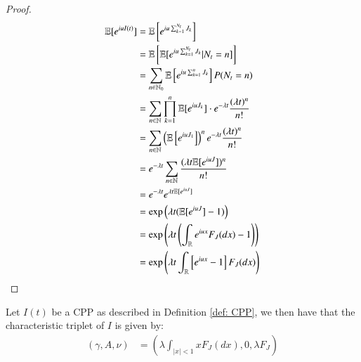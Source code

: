 \begin{proof}

\begin{align*}
\mathbb{E}[e^{iuI(t)}] &= 
\mathbb{E}\left[
e^{iu \sum_{k=1}^{N_{t}}J_{k}}
\right] \\
&= 
\mathbb{E}\left[\mathbb{E}[e^{iu \sum_{k=1}^{N_{t}}J_{k}}|N_{t}=n]\right] \\ 
&= 
\sum_{n\in \mathbb{N}_{0}}\mathbb{E}\left[e^{iu\sum_{k=1}^{n}J_{k}}\right]P(N_{t}=n) \\
&= 
\sum_{n\in \mathbb{N}}\prod_{k=1}^{n}\mathbb{E}[e^{iuJ_{k}}]\cdot e^{-\lambda t}\frac{(\lambda t)^{n}}{n!} \\ 
&= 
\sum_{n\in \mathbb{N}}\left(
\mathbb{E}\left[e^{iuJ_{1}}\right]
\right)^{n}e^{-\lambda t}\frac{(\lambda t)^{n}}{n!} \\ 
&= 
e^{-\lambda t}\sum_{n \in \mathbb{N}}\frac{
(\lambda t \mathbb{E}[e^{iuJ}])^{n}
}{
n!
} \\ 
&= e^{-\lambda t}e^{\lambda t \mathbb{E}[e^{iuJ}]} \\ 
&= \exp\left(
\lambda t(\mathbb{E}[e^{iuJ}] -1)
\right) \\ 
&= 
\exp\left(
\lambda t \left(\int_{\mathbb{R}}e^{iux}F_{J}(dx) - 1\right) 
\right) \\ 
&= 
\exp\left(
\lambda t \int_{\mathbb{R}}\left[e^{iux}-1 \right]F_{J}(dx)
\right)
\end{align*}

\end{proof}

\newpage 

\begin{proposition}
Let $I(t)$ be a CPP as described in Definition \ref{def: CPP}, we then have that the characteristic triplet of $I$ is given by:
\begin{align*}
(\gamma, A, \nu) &= 
\left(
\lambda \int_{|x|<1}xF_{J}(dx), 0, \lambda F_{J}
\right)
\end{align*}
\end{proposition}

